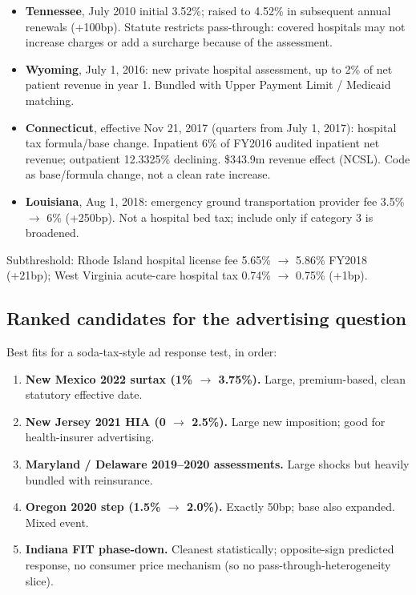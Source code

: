 \begin{itemize}
  \item \textbf{Tennessee}, July 2010 initial 3.52\%; raised
        to 4.52\% in subsequent annual renewals (+100bp).
        Statute restricts pass-through: covered hospitals
        may not increase charges or add a surcharge because
        of the assessment.
  \item \textbf{Wyoming}, July 1, 2016: new private hospital
        assessment, up to 2\% of net patient revenue in year
        1. Bundled with Upper Payment Limit / Medicaid
        matching.
  \item \textbf{Connecticut}, effective Nov 21, 2017 (quarters
        from July 1, 2017): hospital tax formula/base
        change. Inpatient 6\% of FY2016 audited inpatient
        net revenue; outpatient 12.3325\% declining. \$343.9m
        revenue effect (NCSL). Code as base/formula change,
        not a clean rate increase.
  \item \textbf{Louisiana}, Aug 1, 2018: emergency ground
        transportation provider fee 3.5\% $\to$ 6\%
        (+250bp). Not a hospital bed tax; include only if
        category 3 is broadened.
\end{itemize}

Subthreshold: Rhode Island hospital license fee 5.65\% $\to$
5.86\% FY2018 (+21bp); West Virginia acute-care hospital tax
0.74\% $\to$ 0.75\% (+1bp).

\subsection*{Ranked candidates for the advertising question}

Best fits for a soda-tax-style ad response test, in order:

\begin{enumerate}
  \item \textbf{New Mexico 2022 surtax (1\% $\to$ 3.75\%).}
        Large, premium-based, clean statutory effective date.
  \item \textbf{New Jersey 2021 HIA (0 $\to$ 2.5\%).} Large
        new imposition; good for health-insurer advertising.
  \item \textbf{Maryland / Delaware 2019--2020 assessments.}
        Large shocks but heavily bundled with reinsurance.
  \item \textbf{Oregon 2020 step (1.5\% $\to$ 2.0\%).}
        Exactly 50bp; base also expanded. Mixed event.
  \item \textbf{Indiana FIT phase-down.} Cleanest statistically;
        opposite-sign predicted response, no consumer price
        mechanism (so no pass-through-heterogeneity slice).
\end{enumerate}

